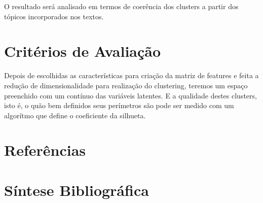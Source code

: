 \documentclass[
	12pt,				%
	a4paper,			%
	english,			%
	brazil,				%
	]{article}
\begin{document}
O resultado será analisado em termos de coerência dos clusters a partir dos tópicos incorporados nos textos.

\section{Crit\' erios de Avalia\c c\~ ao} 

	Depois de escolhidas as caracter\' isticas para cria{\c c}\~ ao da matriz de features e feita a redu{\c c}\~ ao de dimensionalidade para realiza{\c c}\~ ao do clustering, teremos um espa{\c c}o preenchido com um cont\' inuo das variáveis latentes. E a qualidade destes clusters, isto é, o qu\~ ao bem definidos seus per\' imetros s\~ ao pode ser medido com um algor\' itmo que define o coeficiente da silhueta.
    
    
    



\renewcommand\refname{}
\section{Refer\^ encias}

    \vspace{-4.3em}
    
    
\section{S\' intese Bibliogr\' afica}

    \vspace{-3.5em}
    
 
\end{document}
